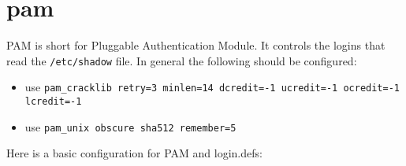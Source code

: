 \section{pam}

PAM is short for Pluggable Authentication Module.
It controls the logins that read the \lstinline|/etc/shadow| file.
In general the following should be configured:

\begin{itemize}
	\item use \lstinline|pam_cracklib retry=3 minlen=14 dcredit=-1 ucredit=-1 ocredit=-1 lcredit=-1|
	\item use \lstinline|pam_unix obscure sha512 remember=5|
\end{itemize}

Here is a basic configuration for PAM and login.defs:

